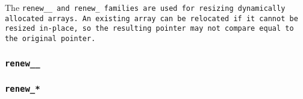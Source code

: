The \tt{renew__} and \tt{renew_} families are
used for resizing dynamically allocated arrays.
An existing array can be relocated if it cannot be resized in-place,
so the resulting pointer may not compare equal to the original pointer.

\subsubsection{\tt{renew__}}


\subsubsection{\tt{renew_}*}

